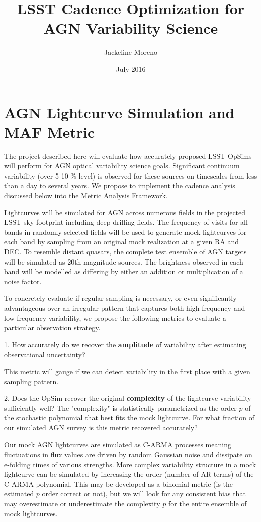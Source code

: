 \documentclass[11pt]{article}
\title{\textbf{LSST Cadence Optimization for AGN Variability Science}}
\author{Jackeline Moreno}
\date{July 2016}
\begin{document}
 \maketitle
    


\section{AGN Lightcurve Simulation and MAF Metric}

The project described here will evaluate how accurately proposed LSST OpSims will perform for AGN optical variability science goals.  Significant continuum variability (over 5-10 \% level) is observed for these sources on timescales from less than a day to several years.  We propose to implement the cadence analysis discussed below into the Metric Analysis Framework.     

Lightcurves will be simulated for AGN across numerous fields in the projected LSST sky footprint including deep drilling fields.  The frequency of visits for all bands in randomly selected fields will be used to generate mock lightcurves for each band by sampling from an original mock realization at a given RA and DEC.  To resemble distant quasars, the complete test ensemble of AGN targets will be simulated as 20th magnitude sources.  The brightness observed in each band will be modelled as differing by either an addition or multiplication of a noise factor.     

To concretely evaluate if regular sampling is necessary, or even significantly advantageous over an irregular pattern that captures both high frequency and low frequency variability,  we propose the following metrics to evaluate a particular observation strategy. 

1. How accurately do we recover the \textbf{amplitude} of variability after estimating observational uncertainty? 

This metric will gauge if we can detect variability in the first place with a given sampling pattern.     


2. Does the OpSim recover the original \textbf{complexity} of the lightcurve variability sufficiently well?
 The "complexity" is statistically parametrized as the order $p$ of the stochastic polynomial that best fits the mock lightcurve. For what fraction of our simulated AGN survey is this metric recovered accurately?
   
   Our mock AGN lightcurves are simulated as C-ARMA processes meaning fluctuations in flux values are driven by random Gaussian noise and dissipate on e-folding times of various strengths.  More complex variability structure in a mock lightcurve can be simulated by increasing the order (number of AR terms) of the C-ARMA polynomial.  This may be developed as a binomial metric (is the estimated $p$ order correct or not), but we will look for any consistent bias that may overestimate or underestimate the complexity $p$ for the entire ensemble of mock lightcurves.  
   
\end{document}
